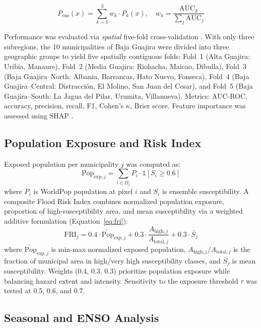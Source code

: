 \documentclass{article}
\begin{document}
\begin{equation}
    P_{\text{ens}}(x) = \sum_{k=1}^{3} w_k \cdot P_k(x), \quad w_k = \frac{\text{AUC}_k}{\sum_{j} \text{AUC}_j}
    \label{eq:ensemble}
\end{equation}

Performance was evaluated via \textit{spatial} five-fold cross-validation \citep{Roberts2017}. With only three subregions, the 10 municipalities of Baja Guajira were divided into three geographic groups to yield five spatially contiguous folds: Fold~1 (Alta Guajira: Uribia, Manaure), Fold~2 (Media Guajira: Riohacha, Maicao, Dibulla), Fold~3 (Baja Guajira--North: Albania, Barrancas, Hato Nuevo, Fonseca), Fold~4 (Baja Guajira--Central: Distracci\'on, El Molino, San Juan del Cesar), and Fold~5 (Baja Guajira--South: La Jagua del Pilar, Urumita, Villanueva). Metrics: AUC-ROC, accuracy, precision, recall, F1, Cohen's $\kappa$, Brier score. Feature importance was assessed using SHAP \citep{Lundberg2017}.

\subsection{Population Exposure and Risk Index}

Exposed population per municipality $j$ was computed as:
\begin{equation}
    \text{Pop}_{\text{exp},j} = \sum_{i \in \Omega_j} P_i \cdot \mathbb{1}[S_i \geq 0.6]
    \label{eq:pop_exposure}
\end{equation}
where $P_i$ is WorldPop population at pixel $i$ and $S_i$ is ensemble susceptibility. A composite Flood Risk Index combines normalized population exposure, proportion of high-susceptibility area, and mean susceptibility via a weighted additive formulation (Equation~\ref{eq:fri}):
\begin{equation}
    \text{FRI}_j = 0.4 \cdot \widetilde{\text{Pop}}_{\text{exp},j} + 0.3 \cdot \frac{A_{\text{high},j}}{A_{\text{total},j}} + 0.3 \cdot \bar{S}_j
    \label{eq:fri}
\end{equation}
where $\widetilde{\text{Pop}}_{\text{exp},j}$ is min-max normalized exposed population, $A_{\text{high},j}/A_{\text{total},j}$ is the fraction of municipal area in high/very high susceptibility classes, and $\bar{S}_j$ is mean susceptibility. Weights (0.4, 0.3, 0.3) prioritize population exposure while balancing hazard extent and intensity. Sensitivity to the exposure threshold $\tau$ was tested at 0.5, 0.6, and 0.7.

\subsection{Seasonal and ENSO Analysis}
\end{document}
